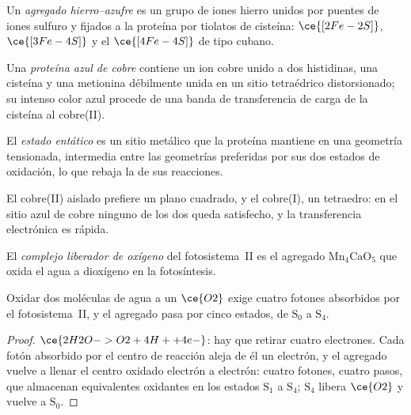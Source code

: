 \begin{definition}\label{def:b3:bioinorganic:fes}
Un \emph{agregado hierro--azufre} es un grupo de iones
hierro unidos por puentes de iones sulfuro y fijados a la proteína por tiolatos de cisteína:
$\ce{[2Fe-2S]}$, $\ce{[3Fe-4S]}$ y el $\ce{[4Fe-4S]}$ de tipo cubano.
\end{definition}

\begin{definition}\label{def:b3:bioinorganic:blue-copper}
Una \emph{proteína azul de cobre} contiene un ion
cobre unido a dos histidinas, una cisteína y una metionina débilmente unida en un
sitio tetraédrico distorsionado; su intenso color azul procede de una banda de transferencia
de carga de la cisteína al cobre(II).
\end{definition}

\begin{definition}\label{def:b3:bioinorganic:entatic}
El \emph{estado entático} es un sitio metálico que la
proteína mantiene en una geometría tensionada, intermedia entre las geometrías preferidas por sus dos
estados de oxidación, lo que rebaja la  de sus reacciones.
\end{definition}

El cobre(II) aislado prefiere un plano cuadrado, y el cobre(I), un tetraedro: en el sitio
azul de cobre ninguno de los dos queda satisfecho, y la transferencia electrónica es rápida.

\begin{definition}\label{def:b3:bioinorganic:oec}
El \emph{complejo liberador de oxígeno} del
fotosistema~II es el agregado $\mathrm{Mn_4CaO_5}$ que oxida el agua a dioxígeno en la
fotosíntesis.
\end{definition}

\begin{proposition}\label{prop:b3:bioinorganic:kok}
Oxidar dos moléculas de agua a un $\ce{O2}$ exige cuatro fotones absorbidos por el
fotosistema~II, y el agregado pasa por cinco estados, de $\mathrm S_0$ a $\mathrm S_4$.
\end{proposition}

\begin{proof}
$\ce{2H2O -> O2 + 4H+ + 4e-}$: hay que retirar cuatro electrones. Cada fotón absorbido por el
centro de reacción aleja de él un electrón, y el agregado vuelve a llenar el centro
oxidado electrón a electrón: cuatro fotones, cuatro pasos, que almacenan
equivalentes oxidantes en los estados $\mathrm S_1$ a $\mathrm S_4$; $\mathrm S_4$ libera $\ce{O2}$ y vuelve a $\mathrm S_0$.
\end{proof}

